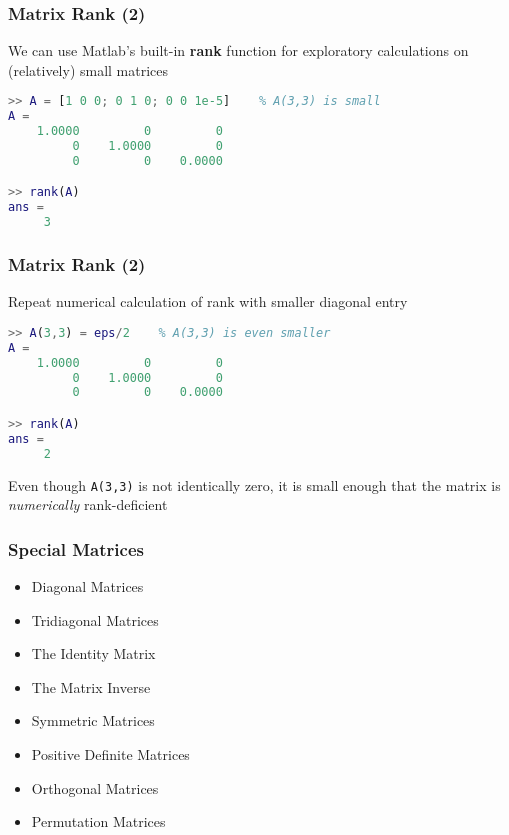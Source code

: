 \documentclass[10pt]{beamer}
\newcommand{\cmd}[1]{{\normalfont\ttfamily\bfseries#1}}
\begin{document}
\begin{frame}[fragile]
\frametitle{Matrix Rank (2)}

We can use Matlab's built-in \cmd{rank} function
for exploratory calculations on (relatively) small matrices
\begin{lstlisting}[language=matlab]
>> A = [1 0 0; 0 1 0; 0 0 1e-5]    % A(3,3) is small
A =
    1.0000         0         0
         0    1.0000         0
         0         0    0.0000

>> rank(A)
ans =
     3
\end{lstlisting}

\end{frame}
\begin{frame}[fragile]
\frametitle{Matrix Rank (2)}

Repeat numerical calculation of rank with smaller diagonal entry
\begin{lstlisting}[language=matlab]
>> A(3,3) = eps/2    % A(3,3) is even smaller
A =
    1.0000         0         0
         0    1.0000         0
         0         0    0.0000

>> rank(A)
ans =
     2
\end{lstlisting}
Even though \texttt{A(3,3)} is not identically zero, it is
small enough that the matrix is \emph{numerically} rank-deficient

\end{frame}
\begin{frame}
\frametitle{Special Matrices}

\begin{itemize}
    \item   Diagonal Matrices
    \item   Tridiagonal Matrices
    \item   The Identity Matrix
    \item   The Matrix Inverse
    \item   Symmetric Matrices
    \item   Positive Definite Matrices
    \item   Orthogonal Matrices
    \item   Permutation Matrices
\end{itemize}

\end{frame}
\end{document}
